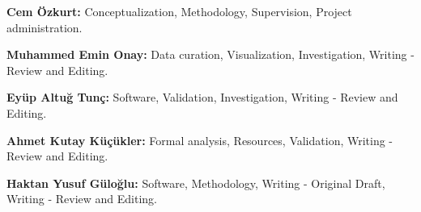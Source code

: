 \noindent\textbf{Cem \"Ozkurt:} Conceptualization, Methodology, Supervision, Project administration.

\noindent\textbf{Muhammed Emin Onay:} Data curation, Visualization, Investigation, Writing - Review and Editing.

\noindent\textbf{Ey\"up Altu\u{g} Tun\c{c}:} Software, Validation, Investigation, Writing - Review and Editing.

\noindent\textbf{Ahmet Kutay K\"u\c{c}\"ukler:} Formal analysis, Resources, Validation, Writing - Review and Editing.

\noindent\textbf{Haktan Yusuf G\"ulo\u{g}lu:} Software, Methodology, Writing - Original Draft, Writing - Review and Editing.
